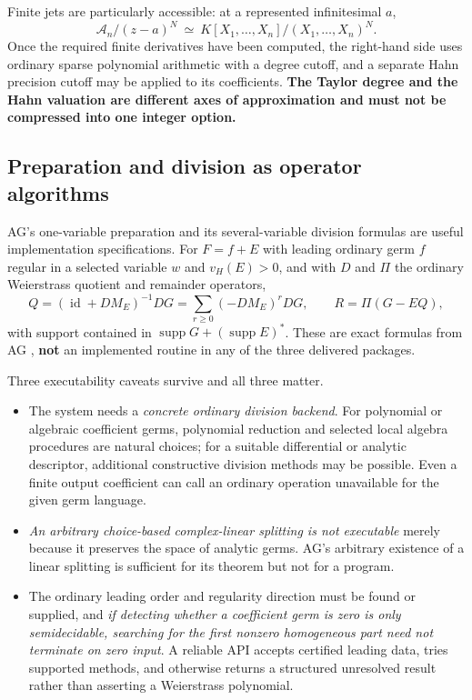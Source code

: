 \documentclass[11pt,letterpaper]{article}
\numberwithin{equation}{section}
\theoremstyle{definition}
\theoremstyle{remark}
\newcommand{\Acal}{\mathscr A}
\newcommand{\supp}{\operatorname{supp}}
\newcommand{\id}{\operatorname{id}}
\newcommand{\vH}{v_{\!H}}
\begin{document}
Finite jets are particularly accessible: at a represented infinitesimal $a$,
\begin{equation}\label{cas:eq-finitejets}
 \Acal_n/(z-a)^N\ \simeq\ K[X_1,\dots,X_n]/(X_1,\dots,X_n)^N .
\end{equation}
Once the required finite derivatives have been computed, the right-hand side
uses ordinary sparse polynomial arithmetic with a degree cutoff, and a separate
Hahn precision cutoff may be applied to its coefficients. \textbf{The Taylor
degree and the Hahn valuation are different axes of approximation and must not
be compressed into one integer option.}

\subsection{Preparation and division as operator algorithms}
\label{cas:sub-weierstrass}
AG's one-variable preparation and its several-variable division formulas are
useful implementation specifications. For $F=f+E$ with leading ordinary germ $f$
regular in a selected variable $w$ and $\vH(E)>0$, and with $D$ and $\Pi$ the
ordinary Weierstrass quotient and remainder operators,
\begin{equation}\label{cas:eq-weierstrass}
 Q=(\id+DM_E)^{-1}DG=\sum_{r\ge0}(-DM_E)^rDG,\qquad
 R=\Pi(G-EQ),
\end{equation}
with support contained in $\supp G+(\supp E)^*$. These are exact formulas from
AG \cite{cas:SourceAG}, \textbf{not} an implemented routine in any of the three
delivered packages.

Three executability caveats survive and all three matter.
\begin{itemize}
\item The system needs a \emph{concrete ordinary division backend}. For
polynomial or algebraic coefficient germs, polynomial reduction and selected
local algebra procedures are natural choices; for a suitable differential or
analytic descriptor, additional constructive division methods may be possible.
Even a finite output coefficient can call an ordinary operation unavailable for
the given germ language.
\item \emph{An arbitrary choice-based complex-linear splitting is not
executable} merely because it preserves the space of analytic germs. AG's
arbitrary existence of a linear splitting is sufficient for its theorem but not
for a program.
\item The ordinary leading order and regularity direction must be found or
supplied, and \emph{if detecting whether a coefficient germ is zero is only
semidecidable, searching for the first nonzero homogeneous part need not
terminate on zero input}. A reliable API accepts certified leading data, tries
supported methods, and otherwise returns a structured unresolved result rather
than asserting a Weierstrass polynomial.
\end{itemize}
\end{document}
